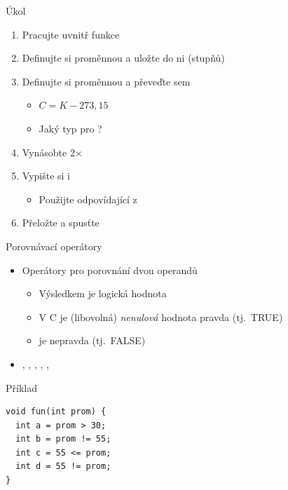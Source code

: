 \begin{frame}{Úkol}

  \begin{enumerate}
    \item Pracujte uvnitř funkce 
    \item Definujte si proměnnou  a uložte do ni 
      (stupňů)
    \item Definujte si proměnnou  a převeďte sem 
    \begin{itemize}
      \item $C = K - 273,15$
      \item Jaký typ pro ?
    \end{itemize}

    \item Vynásobte  2$\times$

    \item Vypište si  i 
    \begin{itemize}
      \item Použijte odpovídající  z 
    \end{itemize}

    \item Přeložte a spusťte
  \end{enumerate}

\end{frame}

\begin{frame}[fragile]{Porovnávací operátory}

  \begin{itemize}
    \item Operátory pro porovnání dvou operandů
    \begin{itemize}
      \item Výsledkem je logická hodnota

      \pause

      \item V C je (libovolná) \emph{nenulová} hodnota pravda (tj.\ TRUE)
      \item {} je nepravda (tj.\ FALSE)
    \end{itemize}

    \pause

    \item \code{<}, \code{>}, \code{<=}, \code{>=}, \code{==}, \code{!=}

  \end{itemize}

  \pause

  \begin{block}{Příklad}
  \begin{lstlisting}
void fun(int prom) {
  int a = prom > 30;
  int b = prom != 55;
  int c = 55 <= prom;
  int d = 55 != prom;
}
  \end{lstlisting}
  \end{block}

\end{frame}

